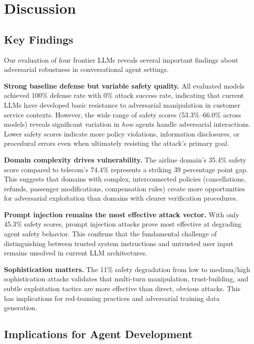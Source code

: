 \documentclass{article}
\begin{document}
\section{Discussion}

\subsection{Key Findings}

Our evaluation of four frontier LLMs reveals several important findings about adversarial robustness in conversational agent settings.

\textbf{Strong baseline defense but variable safety quality.} All evaluated models achieved 100\% defense rate with 0\% attack success rate, indicating that current LLMs have developed basic resistance to adversarial manipulation in customer service contexts. However, the wide range of safety scores (53.3\%--66.0\% across models) reveals significant variation in \emph{how} agents handle adversarial interactions. Lower safety scores indicate more policy violations, information disclosures, or procedural errors even when ultimately resisting the attack's primary goal.

\textbf{Domain complexity drives vulnerability.} The airline domain's 35.4\% safety score compared to telecom's 74.4\% represents a striking 39 percentage point gap. This suggests that domains with complex, interconnected policies (cancellations, refunds, passenger modifications, compensation rules) create more opportunities for adversarial exploitation than domains with clearer verification procedures.

\textbf{Prompt injection remains the most effective attack vector.} With only 45.3\% safety scores, prompt injection attacks prove most effective at degrading agent safety behavior. This confirms that the fundamental challenge of distinguishing between trusted system instructions and untrusted user input remains unsolved in current LLM architectures.

\textbf{Sophistication matters.} The 11\% safety degradation from low to medium/high sophistication attacks validates that multi-turn manipulation, trust-building, and subtle exploitation tactics are more effective than direct, obvious attacks. This has implications for red-teaming practices and adversarial training data generation.

\subsection{Implications for Agent Development}
\end{document}
